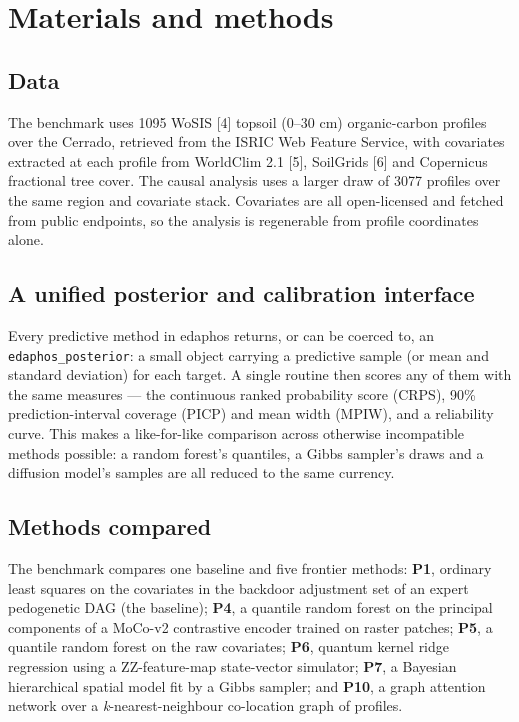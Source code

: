 \documentclass[10pt,letterpaper]{article}
\begin{document}
\section{Materials and methods}\label{materials-and-methods}

\subsection{Data}\label{data}

The benchmark uses 1095 WoSIS {[}4{]} topsoil (0--30 cm) organic-carbon
profiles over the Cerrado, retrieved from the ISRIC Web Feature Service,
with covariates extracted at each profile from WorldClim 2.1 {[}5{]},
SoilGrids {[}6{]} and Copernicus fractional tree cover. The causal
analysis uses a larger draw of 3077 profiles over the same region and
covariate stack. Covariates are all open-licensed and fetched from
public endpoints, so the analysis is regenerable from profile
coordinates alone.

\subsection{A unified posterior and calibration
interface}\label{a-unified-posterior-and-calibration-interface}

Every predictive method in edaphos returns, or can be coerced to, an
\texttt{edaphos\_posterior}: a small object carrying a predictive sample
(or mean and standard deviation) for each target. A single routine then
scores any of them with the same measures --- the continuous ranked
probability score (CRPS), 90\% prediction-interval coverage (PICP) and
mean width (MPIW), and a reliability curve. This makes a like-for-like
comparison across otherwise incompatible methods possible: a random
forest's quantiles, a Gibbs sampler's draws and a diffusion model's
samples are all reduced to the same currency.

\subsection{Methods compared}\label{methods-compared}

The benchmark compares one baseline and five frontier methods:
\textbf{P1}, ordinary least squares on the covariates in the backdoor
adjustment set of an expert pedogenetic DAG (the baseline); \textbf{P4},
a quantile random forest on the principal components of a MoCo-v2
contrastive encoder trained on raster patches; \textbf{P5}, a quantile
random forest on the raw covariates; \textbf{P6}, quantum kernel ridge
regression using a ZZ-feature-map state-vector simulator; \textbf{P7}, a
Bayesian hierarchical spatial model fit by a Gibbs sampler; and
\textbf{P10}, a graph attention network over a
\emph{k}-nearest-neighbour co-location graph of profiles.
\end{document}
